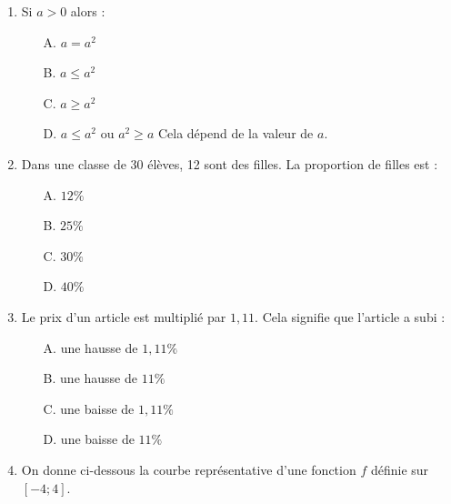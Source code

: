 \documentclass[a4paper,12pt]{article}
\begin{document}
\begin{enumerate}

\item Si $a > 0$ alors :
\begin{itemize}
\item[A.] $a = a^2$
\item[B.] $a \leq a^2$
\item[C.] $a \geq a^2$
\item[D.] $a \leq a^2$ ou $a^2 \geq a$ Cela dépend de la valeur de $a$.
\end{itemize}

\item Dans une classe de 30 élèves, 12 sont des filles. La proportion de filles est :
\begin{itemize}
\item[A.] $12\%$
\item[B.] $25\%$
\item[C.] $30\%$
\item[D.] $40\%$
\end{itemize}

\item Le prix d'un article est multiplié par $1,11$. Cela signifie que l'article a subi :
\begin{itemize}
\item[A.] une hausse de $1,11\%$
\item[B.] une hausse de $11\%$
\item[C.] une baisse de $1,11\%$
\item[D.] une baisse de $11\%$
\end{itemize}

\item On donne ci-dessous la courbe représentative d'une fonction $f$ définie sur $[-4;4]$.


\end{enumerate}
\end{document}
